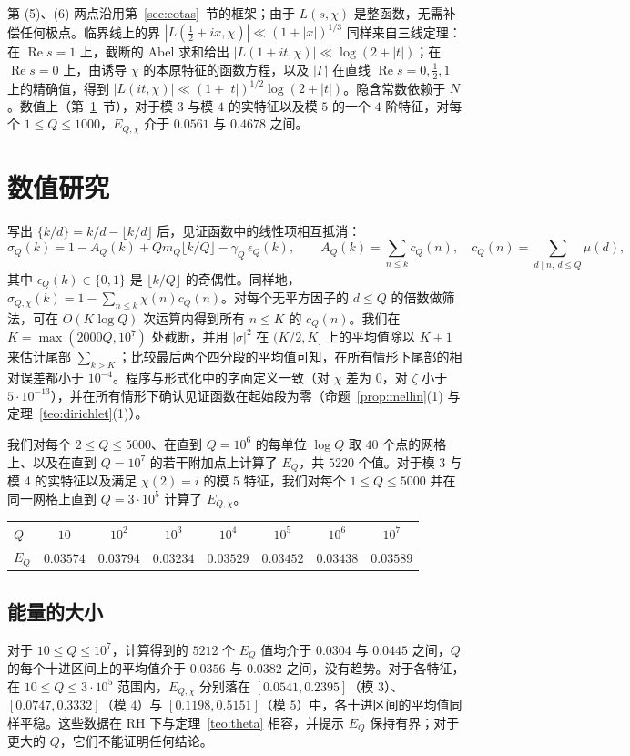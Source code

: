 \documentclass[11pt,a4paper]{amsart}
\theoremstyle{definition}
\theoremstyle{remark}
\renewcommand{\Re}{\operatorname{Re}}
\begin{document}
第 (5)、(6) 两点沿用第~\ref{sec:cotas}~节的框架；由于 $L(s,\chi)$ 是整函数，无需补偿任何极点。临界线上的界 $|L(\tfrac12+ix,\chi)|\ll(1+|x|)^{1/3}$ 同样来自三线定理：在 $\Re s=1$ 上，截断的 Abel 求和给出 $|L(1+it,\chi)|\ll\log(2+|t|)$；在 $\Re s=0$ 上，由诱导 $\chi$ 的本原特征的函数方程，以及 $|\Gamma|$ 在直线 $\Re s=0,\tfrac12,1$ 上的精确值，得到 $|L(it,\chi)|\ll(1+|t|)^{1/2}\log(2+|t|)$。隐含常数依赖于 $N$。数值上（第~\ref{sec:numerica}~节），对于模 $3$ 与模 $4$ 的实特征以及模 $5$ 的一个 $4$ 阶特征，对每个 $1\le Q\le1000$，$E_{Q,\chi}$ 介于 $0.0561$ 与 $0.4678$ 之间。

\section{数值研究}\label{sec:numerica}

写出 $\{k/d\}=k/d-\lfloor k/d\rfloor$ 后，见证函数中的线性项相互抵消：
\[
\sigma_Q(k)=1-A_Q(k)+Qm_Q\lfloor k/Q\rfloor-\gamma_Q\,\epsilon_Q(k),\qquad
A_Q(k)=\sum_{n\le k}c_Q(n),\quad c_Q(n)=\sum_{d\mid n,\ d\le Q}\mu(d),
\]
其中 $\epsilon_Q(k)\in\{0,1\}$ 是 $\lfloor k/Q\rfloor$ 的奇偶性。同样地，$\sigma_{Q,\chi}(k)=1-\sum_{n\le k}\chi(n)c_Q(n)$。对每个无平方因子的 $d\le Q$ 的倍数做筛法，可在 $O(K\log Q)$ 次运算内得到所有 $n\le K$ 的 $c_Q(n)$。我们在 $K=\max(2000Q,10^7)$ 处截断，并用 $|\sigma|^2$ 在 $(K/2,K]$ 上的平均值除以 $K+1$ 来估计尾部 $\sum_{k>K}$；比较最后两个四分段的平均值可知，在所有情形下尾部的相对误差都小于 $10^{-4}$。程序与形式化中的字面定义一致（对 $\chi$ 差为 $0$，对 $\zeta$ 小于 $5\cdot10^{-13}$），并在所有情形下确认见证函数在起始段为零（命题~\ref{prop:mellin}(1) 与定理~\ref{teo:dirichlet}(1)）。

我们对每个 $2\le Q\le5000$、在直到 $Q=10^6$ 的每单位 $\log Q$ 取 $40$ 个点的网格上、以及在直到 $Q=10^7$ 的若干附加点上计算了 $E_Q$，共 $5220$ 个值。对于模 $3$ 与模 $4$ 的实特征以及满足 $\chi(2)=i$ 的模 $5$ 特征，我们对每个 $1\le Q\le5000$ 并在同一网格上直到 $Q=3\cdot10^5$ 计算了 $E_{Q,\chi}$。

\begin{center}
\begin{tabular}{lccccccc}
\toprule
$Q$ & $10$ & $10^2$ & $10^3$ & $10^4$ & $10^5$ & $10^6$ & $10^7$\\
\midrule
$E_Q$ & $0.03574$ & $0.03794$ & $0.03234$ & $0.03529$ & $0.03452$ & $0.03438$ & $0.03589$\\
\bottomrule
\end{tabular}
\end{center}

\subsection*{能量的大小}
对于 $10\le Q\le10^7$，计算得到的 $5212$ 个 $E_Q$ 值均介于 $0.0304$ 与 $0.0445$ 之间，$Q$ 的每个十进区间上的平均值介于 $0.0356$ 与 $0.0382$ 之间，没有趋势。对于各特征，在 $10\le Q\le3\cdot10^5$ 范围内，$E_{Q,\chi}$ 分别落在 $[0.0541,0.2395]$（模 $3$）、$[0.0747,0.3332]$（模 $4$）与 $[0.1198,0.5151]$（模 $5$）中，各十进区间的平均值同样平稳。这些数据在 RH 下与定理~\ref{teo:theta} 相容，并提示 $E_Q$ 保持有界；对于更大的 $Q$，它们不能证明任何结论。
\end{document}
